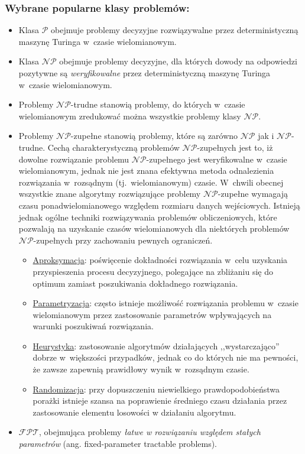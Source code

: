 \subsubsection{Wybrane popularne klasy problemów:}
\label{sss_popular_cplx_classes}
\par{
\begin{itemize}
  \item Klasa $\mathcal{P}$ obejmuje problemy decyzyjne rozwiązywalne przez
    deterministyczną maszynę Turinga w~czasie wielomianowym.
  \item Klasa $\mathcal{NP}$ obejmuje problemy decyzyjne, dla których dowody na 
    odpowiedzi pozytywne są \emph{weryfikowalne} przez deterministyczną maszynę
    Turinga w~czasie wielomianowym.
  \item Problemy $\mathcal{NP}$-trudne stanowią problemy, do których w~czasie
    wielomianowym zredukować można wszystkie problemy klasy $\mathcal{NP}$.
  \item Problemy $\mathcal{NP}$-zupełne stanowią problemy, które są zarówno
    $\mathcal{NP}$ jak i $\mathcal{NP}$-trudne.
    Cechą charakterystyczną problemów $\mathcal{NP}$-zupełnych jest to, iż
    dowolne rozwiązanie problemu $\mathcal{NP}$-zupełnego jest weryfikowalne
    w~czasie wielomianowym, jednak nie jest znana efektywna metoda odnalezienia
    rozwiązania w~rozsądnym (tj.\ wielomianowym) czasie. 
    W~chwili obecnej wszystkie znane algorytmy rozwiązujące problemy 
    $\mathcal{NP}$-zupełne wymagają czasu ponadwielomianowego względem rozmiaru
    danych wejściowych.
    Istnieją jednak ogólne techniki rozwiązywania problemów obliczeniowych,
    które pozwalają na uzyskanie czasów wielomianowych dla niektórych problemów
    $\mathcal{NP}$-zupełnych przy zachowaniu pewnych ograniczeń.
    \begin{itemize}
      \item \underline{Aproksymacja}: poświęcenie dokładności rozwiązania
        w~celu uzyskania przyspieszenia procesu decyzyjnego, polegające na zbliżaniu się do
        optimum zamiast poszukiwania dokładnego rozwiązania.
      \item \underline{Parametryzacja}: często istnieje możliwość rozwiązania
        problemu w~czasie wielomianowym przez zastosowanie parametrów wpływających na warunki
        poszukiwań rozwiązania.
      \item \underline{Heurystyka}: zastosowanie algorytmów działających
        ,,wystarczająco'' dobrze w~większości przypadków, jednak co do których
        nie ma pewności, że zawsze zapewnią prawidłowy wynik w~rozsądnym czasie.
      \item \underline{Randomizacja}: przy dopuszczeniu niewielkiego
        prawdopodobieństwa porażki istnieje szansa na poprawienie
        średniego czasu działania przez zastosowanie elementu losowości w
        działaniu algorytmu.
    \end{itemize}
  \item $\mathcal{FPT}$, obejmująca problemy \emph{łatwe w rozwiązaniu względem stałych parametrów} (ang. fixed-parameter tractable problems).
\end{itemize}

}
